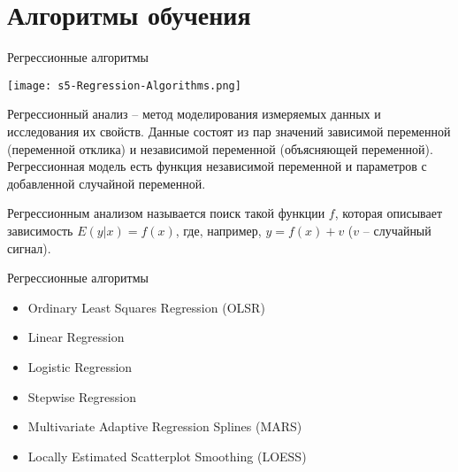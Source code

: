 \documentclass[pdf, intlimits, 9pt, unicode]{beamer}
\begin{document}
\section{Алгоритмы обучения}





\begin{frame}{Регрессионные алгоритмы}

\begin{center}\texttt{[image: s5-Regression-Algorithms.png]}\end{center}

Регрессионный анализ -- метод моделирования измеряемых данных и исследования их свойств. \pause Данные состоят из пар значений зависимой переменной (переменной отклика) и независимой переменной (объясняющей переменной). \pause Регрессионная модель есть функция независимой переменной и параметров с добавленной случайной переменной.\pause

Регрессионным анализом называется поиск такой функции $f$, которая описывает зависимость $E(y|x) = f(x)$,  где, например, $y = f(x) + v$ ($v$ -- случайный сигнал).

\end{frame}




\begin{frame}{Регрессионные алгоритмы}
\begin{itemize}
\item Ordinary Least Squares Regression (OLSR)
\item Linear Regression
\item Logistic Regression
\item Stepwise Regression
\item Multivariate Adaptive Regression Splines (MARS)
\item Locally Estimated Scatterplot Smoothing (LOESS)
\end{itemize}
\end{frame}
\end{document}
